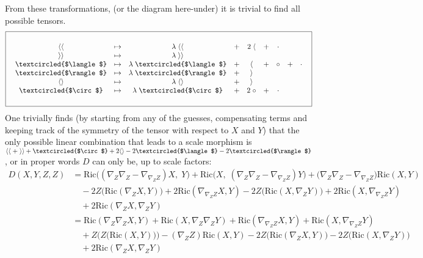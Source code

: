 \documentclass[a4paper,11pt]{article}
\newcommand{\R}{{\mathrm{Ric}}}
\begin{document}
From these transformations, (or the diagram here-under) it is trivial to find all possible tensors.
\begin{equation}
\boxed{\quad \begin{matrix}
    \quad\\
    \langle\langle & \mapsto  & \lambda\; \langle\langle & + & 2 \; \langle & + & \cdot \\
    \rangle\rangle & \mapsto & \lambda\; \rangle\rangle \\
    \textcircled{$\langle$} & \mapsto & \lambda\; \textcircled{$\langle$} & + & \langle & + & \circ & + & \cdot \\
    \textcircled{$\rangle$} & \mapsto & \lambda\; \textcircled{$\rangle$} & + & \rangle  \\
    \langle\rangle & \mapsto & \lambda\; \langle\rangle & + & \rangle \\
    \textcircled{$\circ$} & \mapsto & \lambda\; \textcircled{$\circ$} & + & 2 \; \circ & + & \cdot\\
    \quad
\end{matrix}\quad }
\end{equation}
One trivially finds (by starting from any of the guesses, compensating terms and keeping track of the symmetry of the tensor with respect to $X$ and $Y$) that the only possible linear combination that leads to a scale morphism is $\langle\langle \; + \;\rangle\rangle+\textcircled{$\circ$} + 2 \langle\rangle - 2 \textcircled{$\langle$}- 2 \textcircled{$\rangle$}$, or in proper words $D$ can only be, up to scale factors:
\begin{align*}
    D(X,Y,Z,Z) &= \R\big((\nabla_Z\nabla_Z-\nabla_{\nabla_Z Z}) X,\;Y\big)
    + \R\big( X,\;(\nabla_Z\nabla_Z-\nabla_{\nabla_Z Z})Y\big)
    + \big(\nabla_Z\nabla_Z-\nabla_{\nabla_Z Z}\big)\R(X,Y)\\
    & \quad -2 Z\big(\R(\nabla_Z X, Y)\big)
    +2 \R(\nabla_{\nabla_ZZ} X,Y) 
    -2 Z\big(\R(X, \nabla_Z Y)\big)
    +2 \R( X,\nabla_{\nabla_ZZ}Y) \\
    & \quad + 2 \R(\nabla_Z X, \nabla_Z Y)\\
    &=\R(\nabla_Z\nabla_Z X,Y)
    + \R( X,\nabla_Z\nabla_ZY)
    + \R(\nabla_{\nabla_ZZ} X,Y)
    + \R( X,\nabla_{\nabla_ZZ}Y)\\
    & \quad + Z\big(Z\big(\R(X,Y)\big)\big)-(\nabla_Z Z)\R(X,Y)
    -2 Z\big(\R(\nabla_Z X, Y)\big)
    -2 Z\big(\R(X, \nabla_Z Y)\big) \\
    & \quad + 2 \R(\nabla_Z X, \nabla_Z Y) 
\end{align*}
\end{document}
